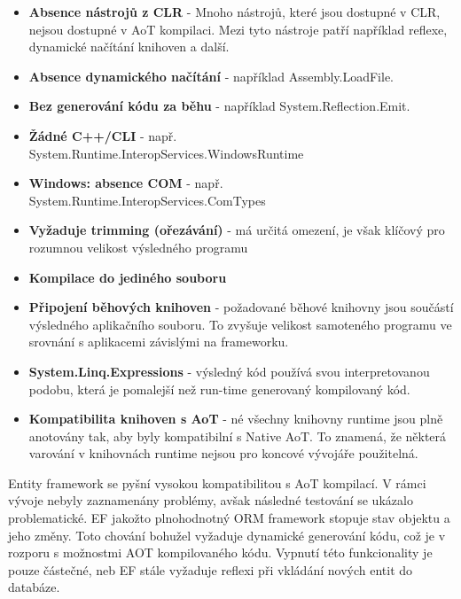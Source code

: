 \begin{itemize}
    \item  \textbf{Absence nástrojů z CLR} - Mnoho nástrojů, které jsou dostupné v CLR, nejsou dostupné v AoT kompilaci. Mezi tyto nástroje patří například reflexe, dynamické načítání knihoven a další.
    \item \textbf{Absence dynamického načítání} - například Assembly.LoadFile.
    \item \textbf{Bez generování kódu za běhu} - například System.Reflection.Emit.
    \item \textbf{Žádné C++/CLI} - např. System.Runtime.InteropServices.WindowsRuntime
    \item \textbf{Windows: absence COM} - např. System.Runtime.InteropServices.ComTypes
    \item \textbf{Vyžaduje trimming (ořezávání)} - má určitá omezení, je však klíčový pro rozumnou velikost výsledného programu
    \item \textbf{Kompilace do jediného souboru} 
    \item \textbf{Připojení běhových knihoven} - požadované běhové knihovny jsou součástí výsledného aplikačního souboru. To zvyšuje velikost samoteného programu ve srovnání s aplikacemi závislými na frameworku.
    \item \textbf{System.Linq.Expressions} - výsledný kód používá svou interpretovanou podobu, která je pomalejší než run-time generovaný kompilovaný kód.
    \item \textbf{Kompatibilita knihoven s AoT} - né všechny knihovny runtime jsou plně anotovány tak, aby byly kompatibilní s Native AoT. To znamená, že některá varování v knihovnách runtime nejsou pro koncové vývojáře použitelná.
\end{itemize}





Entity framework se pyšní vysokou kompatibilitou s AoT kompilací. V rámci vývoje nebyly zaznamenány problémy, avšak následné testování se ukázalo problematické. EF jakožto plnohodnotný ORM framework stopuje stav objektu a jeho změny. Toto chování bohužel vyžaduje dynamické generování kódu, což je v rozporu s možnostmi AOT kompilovaného kódu. Vypnutí této funkcionality je pouze částečné, neb EF stále vyžaduje reflexi při vkládání nových entit do databáze.


